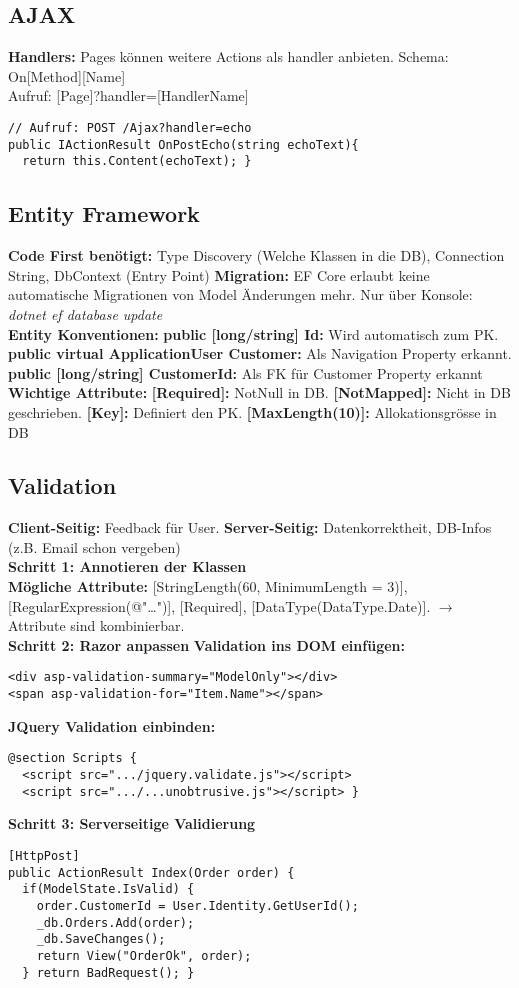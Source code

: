 \subsection{AJAX}
\textcolor{b}{\textbf{Handlers:}} Pages können weitere Actions als handler anbieten. Schema: \textcolor{b}{On[Method][Name]}\\
Aufruf: \textcolor{b}{[Page]?handler=[HandlerName]}
\begin{lstlisting}[style=csh]
// Aufruf: POST /Ajax?handler=echo
public IActionResult OnPostEcho(string echoText){
  return this.Content(echoText); }
\end{lstlisting}
\subsection{Entity Framework}
\textcolor{b}{\textbf{Code First benötigt:}} Type Discovery (Welche Klassen in die DB), Connection String, DbContext (Entry Point) \textcolor{b}{\textbf{Migration:}} EF Core erlaubt keine automatische Migrationen von Model Änderungen mehr. Nur über Konsole: \textit{dotnet ef database update}\\
\textcolor{b}{\textbf{Entity Konventionen:}} \textbf{public [long/string] Id:} Wird automatisch zum PK. \textbf{public virtual ApplicationUser Customer:} Als Navigation Property erkannt. \textbf{public [long/string] CustomerId:} Als FK für Customer Property erkannt\\
\textcolor{b}{\textbf{Wichtige Attribute:}} \textbf{[Required]:} NotNull in DB. \textbf{[NotMapped]:} Nicht in DB geschrieben. \textbf{[Key]:} Definiert den PK. \textbf{[MaxLength(10)]:} Allokationsgrösse in DB
\subsection{Validation}
\textbf{Client-Seitig:} Feedback für User. \textbf{Server-Seitig:} Datenkorrektheit, DB-Infos (z.B. Email schon vergeben)\\
\textcolor{b}{\textbf{Schritt 1: Annotieren der Klassen}}\\
\textbf{Mögliche Attribute:} [StringLength(60, MinimumLength = 3)], [RegularExpression(@"\ldots")], [Required], [DataType(DataType.Date)]. $\rightarrow$ Attribute sind kombinierbar.\\
\textcolor{b}{\textbf{Schritt 2: Razor anpassen}} \textbf{Validation ins DOM einfügen:}
\begin{lstlisting}[style=csh]
<div asp-validation-summary="ModelOnly"></div>
<span asp-validation-for="Item.Name"></span>
\end{lstlisting}
\textbf{JQuery Validation einbinden:}
\begin{lstlisting}[style=csh]
@section Scripts {
  <script src=".../jquery.validate.js"></script>
  <script src=".../...unobtrusive.js"></script> }
\end{lstlisting}
\textcolor{b}{\textbf{Schritt 3: Serverseitige Validierung}}
\begin{lstlisting}[style=csh]
[HttpPost]
public ActionResult Index(Order order) {
  if(ModelState.IsValid) {
    order.CustomerId = User.Identity.GetUserId();
    _db.Orders.Add(order);
    _db.SaveChanges();
    return View("OrderOk", order);
  } return BadRequest(); }
\end{lstlisting}
